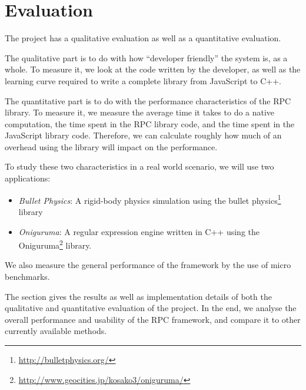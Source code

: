 \chapter{Evaluation}
\label{Chapter6}

The project has a qualitative evaluation as well as a quantitative evaluation.

The qualitative part is to do with how ``developer friendly'' the system is, as a whole. To measure it, we look at the code written by the developer, as well as the learning curve required to write a complete library from JavaScript to C++.

The quantitative part is to do with the performance characteristics of the RPC library. To measure it, we measure the average time it takes to do a native computation, the time spent in the RPC library code, and the time spent in the JavaScript library code. Therefore, we can calculate roughly how much of an overhead using the library will impact on the performance.

To study these two characteristics in a real world scenario, we will use two applications:

\begin{itemize}
	\item \emph{Bullet Physics}: A rigid-body physics simulation using the bullet physics\footnote{\url{http://bulletphysics.org/}} library
	\item \emph{Oniguruma}: A regular expression engine written in C++ using the Oniguruma\footnote{\url{http://www.geocities.jp/kosako3/oniguruma/}} library.
\end{itemize}

We also measure the general performance of the framework by the use of micro benchmarks.

The section gives the results as well as implementation details of both the qualitative and quantitative evaluation of the project. In the end, we analyse the overall performance and usability of the RPC framework, and compare it to other currently available methods.


\pagebreak


\pagebreak